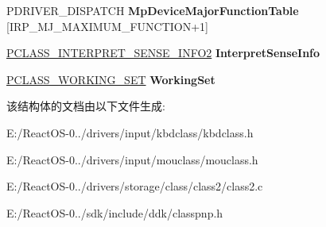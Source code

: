 \begin{DoxyCompactItemize}
\mbox{\label{struct___c_l_a_s_s___d_r_i_v_e_r___e_x_t_e_n_s_i_o_n_a11b01e9ac37286dfe461e8ad9c550521}} 
P\+D\+R\+I\+V\+E\+R\+\_\+\+D\+I\+S\+P\+A\+T\+CH {\bfseries Mp\+Device\+Major\+Function\+Table} \mbox{[}I\+R\+P\+\_\+\+M\+J\+\_\+\+M\+A\+X\+I\+M\+U\+M\+\_\+\+F\+U\+N\+C\+T\+I\+ON+1\mbox{]}
\item 
\mbox{\label{struct___c_l_a_s_s___d_r_i_v_e_r___e_x_t_e_n_s_i_o_n_af85cba795f3a657a87ae5b597edcef4a}} 
\hyperlink{struct___c_l_a_s_s___i_n_t_e_r_p_r_e_t___s_e_n_s_e___i_n_f_o2}{P\+C\+L\+A\+S\+S\+\_\+\+I\+N\+T\+E\+R\+P\+R\+E\+T\+\_\+\+S\+E\+N\+S\+E\+\_\+\+I\+N\+F\+O2} {\bfseries Interpret\+Sense\+Info}
\item 
\mbox{\label{struct___c_l_a_s_s___d_r_i_v_e_r___e_x_t_e_n_s_i_o_n_a0c4572de15e72b0bf3e5ceceaa58dbb8}} 
\hyperlink{struct___c_l_a_s_s___w_o_r_k_i_n_g___s_e_t}{P\+C\+L\+A\+S\+S\+\_\+\+W\+O\+R\+K\+I\+N\+G\+\_\+\+S\+ET} {\bfseries Working\+Set}
\end{DoxyCompactItemize}


该结构体的文档由以下文件生成\+:\begin{DoxyCompactItemize}
\item 
E\+:/\+React\+O\+S-\/0../drivers/input/kbdclass/kbdclass.\+h\item 
E\+:/\+React\+O\+S-\/0../drivers/input/mouclass/mouclass.\+h\item 
E\+:/\+React\+O\+S-\/0../drivers/storage/class/class2/class2.\+c\item 
E\+:/\+React\+O\+S-\/0../sdk/include/ddk/classpnp.\+h\end{DoxyCompactItemize}
